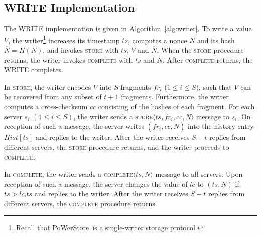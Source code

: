 \documentclass[10pt,conference,compsocconf]{IEEEtran}
\newcommand{\protocol}{PoWerStore}
\newcommand{\complete}{\textsc{complete}}
\newcommand{\nonce}{N}
\newcommand{\hash}{\overline{N}}
\begin{document}
\subsection{\textsc{WRITE} Implementation}

The \textsc{WRITE} implementation is given in Algorithm~\ref{alg:writer}. To write a value $V$, the writer\footnote{Recall that \protocol\ is a single-writer storage protocol.} increases its timestamp $ts$, computes a nonce $\nonce$ and its hash $\hash = H(\nonce)$, and invokes \textsc{store} with $ts$, $V$ and $\hash$. When the \textsc{store} procedure returns, the writer invokes \textsc{\complete} with $ts$ and $\nonce$. After \textsc{\complete} returns, the \textsc{WRITE} completes.

In \textsc{store}, the writer encodes $V$ into $S$ fragments $fr_i$ ($1 \leq i \leq S)$, such that $V$ can be recovered from any subset of $t+1$ fragments. Furthermore, the writer computes a cross-checksum $cc$ consisting of the hashes of each fragment. For each server $s_i$ $(1 \leq i \leq S)$, the writer sends a \textsc{store}$\langle ts, fr_i, cc, \hash \rangle$ message to $s_i$. On reception of such a message, the server writes $(fr_i, cc, \hash)$ into the history entry $Hist[ts]$ and replies to the writer.
After the writer receives $S-t$ replies from different servers, the \textsc{store} procedure returns, and the writer proceeds to \textsc{\complete}.

In \textsc{\complete}, the writer sends a \textsc{\complete}$\langle ts, \nonce \rangle$ message to all servers. Upon reception of such a message, the server changes the value of $lc$ to $(ts, \nonce)$ if $ts > lc.ts$ and replies to the writer. After the writer receives $S-t$ replies from different servers, the \textsc{\complete} procedure returns.
\end{document}
